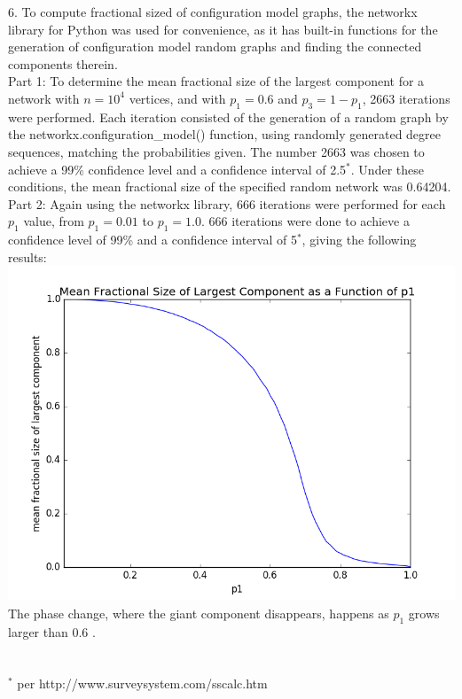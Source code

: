 \documentclass[11pt, oneside]{article}   	%
\begin{document}
6. To compute fractional sized of configuration model graphs, the networkx library for Python was used for convenience, as it has built-in functions for the generation of configuration model random graphs and finding the connected components therein.\\
\indent Part 1: To determine the mean fractional size of the largest component for a network with $n=10^4$ vertices, and with $p_1 = 0.6$ and $p_3 = 1-p_1$, 2663 iterations were performed.  Each iteration consisted of the generation of a random graph by the networkx.configuration\_model() function, using randomly generated degree sequences, matching the probabilities given.  The number 2663 was chosen to achieve a 99\% confidence level and a confidence interval of 2.5$^*$.  Under these conditions, the mean fractional size of the specified random network was 0.64204.\\
\indent Part 2:  Again using the networkx library, 666 iterations were performed for each $p_1$ value, from $p_1 = 0.01$ to $p_1 = 1.0$.  666 iterations were done to achieve a confidence level of 99\% and a confidence interval of 5$^*$, giving the following results:\\
\includegraphics[scale=.5]{meanFractionalSize.png}\\
\indent The phase change, where the giant component disappears, happens as $p_1$ grows larger than 0.6 .\\\\\\
$^*$ per http://www.surveysystem.com/sscalc.htm\\\\\\\\\\\\\\
\inputminted[linenos,fontsize=\scriptsize]{python}{PS3.py}
\inputminted[linenos,fontsize=\scriptsize]{python}{Q42.py}
\inputminted[linenos,fontsize=\scriptsize]{python}{ec.py}
\inputminted[linenos,fontsize=\scriptsize]{python}{plotter.py}
\end{document}
